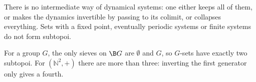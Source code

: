 \inwords{} There is no intermediate way of  dynamical systems: one either keeps all of them, or makes the dynamics invertible by passing to its colimit, or collapses everything. Sets with a fixed point, eventually periodic systems or finite systems do not form subtopoi.

\begin{example}
For a group $G$, the only sieves on $\B G$ are $\emptyset$ and $G$, so $G$-sets have exactly two subtopoi. For $(\mathbb N^2,+)$ there are more than three: inverting the first generator only gives a fourth.
\end{example}

